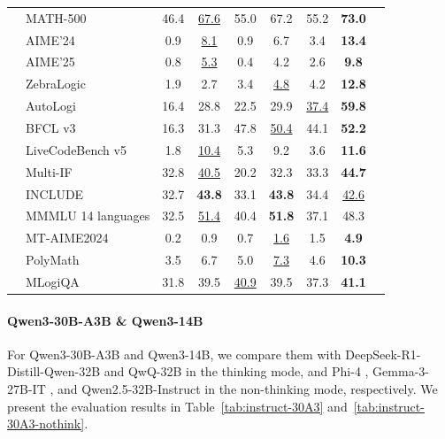 \begin{table}[tbp]
{\begin{tabular}{@{}clccccccc@{}}
\midrule
{} & MATH-500 & 46.4 & \underline{67.6} & 55.0 & 67.2 & 55.2 & \textbf{73.0} \\
& AIME'24 & 0.9 & \underline{8.1} & 0.9 & 6.7 & 3.4 & \textbf{13.4} \\
& AIME'25 & 0.8 & \underline{5.3} & 0.4 & 4.2 & 2.6 & \textbf{9.8} \\
& ZebraLogic & 1.9 & 2.7 & 3.4 & \underline{4.8} & 4.2 & \textbf{12.8} \\
& AutoLogi & 16.4 & 28.8 & 22.5 & 29.9 & \underline{37.4} & \textbf{59.8} \\
\midrule
{} & BFCL v3 & 16.3 & 31.3 & 47.8 & \underline{50.4} & 44.1 & \textbf{52.2} \\
& LiveCodeBench v5 & 1.8 & \underline{10.4} & 5.3 & 9.2 & 3.6 & \textbf{11.6} \\
\midrule
{} & Multi-IF & 32.8 & \underline{40.5} & 20.2 & 32.3 & 33.3 & \textbf{44.7} \\
& INCLUDE & 32.7 & \textbf{43.8} & 33.1 & \textbf{43.8} & 34.4 & \underline{42.6} \\
& MMMLU {\tiny{14 languages}} & 32.5 & \underline{51.4} & 40.4 & \textbf{51.8} & 37.1 & 48.3 \\
& MT-AIME2024 & 0.2 & 0.9 & 0.7 & \underline{1.6} & 1.5 & \textbf{4.9} \\
& PolyMath & 3.5 & 6.7 & 5.0 & \underline{7.3} & 4.6 & \textbf{10.3} \\
& MLogiQA & 31.8 & 39.5 & \underline{40.9} & 39.5 & 37.3 & \textbf{41.1} \\
\bottomrule
\end{tabular}
}
\end{table}

\paragraph{Qwen3-30B-A3B \& Qwen3-14B}
For Qwen3-30B-A3B and Qwen3-14B, we compare them with DeepSeek-R1-Distill-Qwen-32B and QwQ-32B in the thinking mode, and Phi-4 \citep{phi4}, Gemma-3-27B-IT \citep{gemma3}, and Qwen2.5-32B-Instruct in the non-thinking mode, respectively.
We present the evaluation results in Table~\ref{tab:instruct-30A3} and~\ref{tab:instruct-30A3-nothink}.

